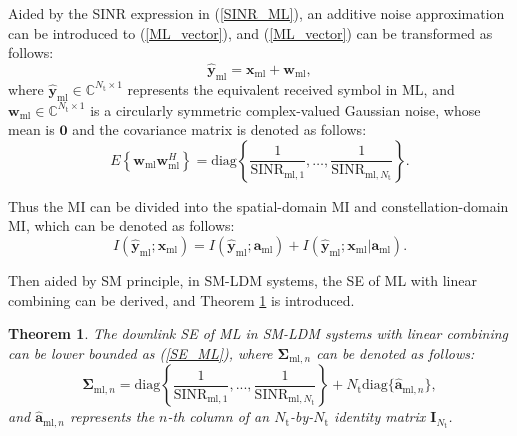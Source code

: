 \documentclass[journal]{IEEEtran}
\newtheorem{theorem}{\textbf{Theorem}}
\begin{document}
Aided by the SINR expression in (\ref{SINR_ML}), an additive noise approximation can be introduced to (\ref{ML_vector}), and (\ref{ML_vector}) can be transformed as follows:
\begin{equation}
\hat{\mathbf{y}}_{\text{ml}} = \mathbf{x}_{\text{ml}} + \mathbf{w}_{\text{ml}},
\label{ML_equal}
\end{equation}
where $\hat{\mathbf{y}}_{\text{ml}} \in \mathbb{C}^{N_\text{t}\times 1}$ represents the equivalent received symbol in ML, and $\mathbf{w}_\text{ml}\in \mathbb{C}^{N_\text{t}\times 1}$ is a circularly symmetric complex-valued Gaussian noise, whose mean is $\mathbf{0}$ and the covariance matrix is denoted as follows:
\begin{equation}
E\left\{\mathbf{w}_\text{ml}\mathbf{w}_\text{ml}^H\right\} = \text{diag}\left\{\frac{1}{\text{SINR}_{\text{ml},1}},\ldots,\frac{1}{\text{SINR}_{\text{ml},N_\text{t}}}\right\}.
\end{equation}

Thus the MI can be divided into the spatial-domain MI and constellation-domain MI, which can be denoted as follows:
\begin{equation}
I\left(\hat{\mathbf{y}}_{\text{ml}};\mathbf{x}_{\text{ml}}\right)= I\left(\hat{\mathbf{y}}_{\text{ml}};\mathbf{a}_\text{ml}\right) + I\left(\hat{\mathbf{y}}_{\text{ml}};\mathbf{x}_{\text{ml}}|\mathbf{a}_\text{ml}\right).
\label{ML_split}
\end{equation}

Then aided by SM principle, in SM-LDM systems, the SE of ML with linear combining can be derived, and Theorem \ref{theorem_1} is introduced.

\begin{theorem}
The downlink SE of ML in SM-LDM systems with linear combining can be lower bounded as (\ref{SE_ML}), where $\mathbf{\Sigma}_{\text{ml},n}$ can be denoted as follows:
\begin{equation}
\mathbf{\Sigma}_{\text{ml},n} = \text{diag}\left\{\frac{1}{\text{SINR}_{\text{ml},1}}, ..., \frac{1}{\text{SINR}_{\text{ml},N_\text{t}}}\right\} + N_\text{t} \text{diag}\{\hat{\mathbf{a}}_{\text{ml},n}\},
\label{Sigma}
\end{equation}
and $\hat{\mathbf{a}}_{\text{ml},n}$ represents the $n$-th column of an $N_\text{t}$-by-$N_\text{t}$ identity matrix $\mathbf{I}_{N_\text{t}}$.
\label{theorem_1}
\end{theorem}
\end{document}
